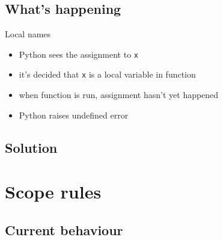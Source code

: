 \documentclass{beamer}
\begin{document}
\begin{frame}
\begin{center}
\structure{\insertsection}
\end{center}

\pause 
\end{frame}

\subsection{What's happening}
\begin{frame}
Local names \\
\begin{itemize}
\item Python sees the assignment to \texttt{x}
\item it's decided that \texttt{x} is a local variable in function
\item when function is run, assignment hasn't yet happened
\item Python raises undefined error
\end{itemize}
\end{frame}

\subsection{Solution}
\begin{frame}

\pause 
\end{frame}

\section{Scope rules}
\subsection{Current behaviour}
\begin{frame}
\begin{center}
\structure{\insertsection}
\end{center}

\pause 
\end{frame}
\end{document}
